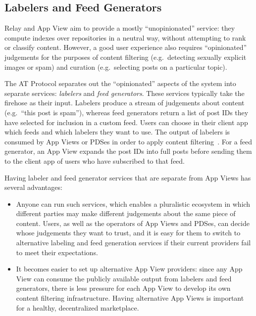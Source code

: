\documentclass[sigconf]{acmart}
\begin{document}

\subsection{Labelers and Feed Generators}\label{sec:labeling}

Relay and App View aim to provide a mostly ``unopinionated'' service: they compute indexes over repositories in a neutral way, without attempting to rank or classify content.
However, a good user experience also requires ``opinionated'' judgements for the purposes of content filtering (e.g.\ detecting sexually explicit images or spam) and curation (e.g.\ selecting posts on a particular topic).

The AT Protocol separates out the ``opinionated'' aspects of the system into separate services: \emph{labelers} and \emph{feed generators}.
These services typically take the firehose as their input.
Labelers produce a stream of judgements about content (e.g.\ ``this post is spam''), whereas feed generators return a list of post IDs they have selected for inclusion in a custom feed.
Users can choose in their client app which feeds and which labelers they want to use.
The output of labelers is consumed by App Views or PDSes in order to apply content filtering~\cite{Labeling}.
For a feed generator, an App View expands the post IDs into full posts before sending them to the client app of users who have subscribed to that feed.

Having labeler and feed generator services that are separate from App Views has several advantages:
\begin{itemize}
    \item Anyone can run such services, which enables a pluralistic ecosystem in which different parties may make different judgements about the same piece of content.
        Users, as well as the operators of App Views and PDSes, can decide whose judgements they want to trust, and it is easy for them to switch to alternative labeling and feed generation services if their current providers fail to meet their expectations.
    \item It becomes easier to set up alternative App View providers: since any App View can consume the publicly available output from labelers and feed generators, there is less pressure for each App View to develop its own content filtering infrastructure.
        Having alternative App Views is important for a healthy, decentralized marketplace.
\end{itemize}
\end{document}
